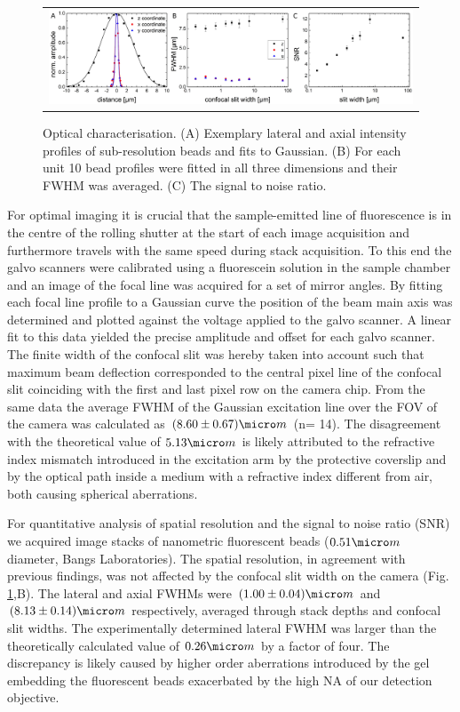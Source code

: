 \documentclass[12pt]{spieman}  %
\begin{document}
\begin{figure}
   \begin{center}
   \begin{tabular}{c}
   \includegraphics[width=\textwidth]{origin.eps}
   \end{tabular}
   \end{center}
   \caption{\label{fig:origin} Optical characterisation. (A) Exemplary lateral and axial intensity profiles of sub-resolution beads and fits to Gaussian. (B) For each unit 10 bead profiles were fitted in all three dimensions and their FWHM was averaged. (C) The signal to noise ratio.} 
\end{figure}

For optimal imaging it is crucial that the sample-emitted line of fluorescence is in the centre of the rolling shutter at the start of each image acquisition and furthermore travels with the same speed during stack acquisition. To this end the galvo scanners were calibrated using a fluorescein solution in the sample chamber and an image of the focal line was acquired for a set of mirror angles. By fitting each focal line profile to a Gaussian curve the position of the beam main axis was determined and plotted against the voltage applied to the galvo scanner. A linear fit to this data yielded the precise amplitude and offset for each galvo scanner. The finite width of the confocal slit was hereby taken into account such that maximum beam deflection corresponded to the central pixel line of the confocal slit coinciding with the first and last pixel row on the camera chip. From the same data the average FWHM of the Gaussian excitation line over the FOV of the camera was calculated as $(8.60\pm0.67)\micro m$ (n= 14). The disagreement with the theoretical value of $5.13 \micro m$ is likely attributed to the refractive index mismatch introduced in the excitation arm by the protective coverslip and by the optical path inside a medium with a refractive index different from air, both causing spherical aberrations\cite{Booth2001}.

For quantitative analysis of spatial resolution and the signal to noise ratio (SNR) we acquired image stacks of nanometric fluorescent beads ($0.51 \micro m$ diameter, Bangs Laboratories). The spatial resolution, in agreement with previous findings\cite{Wilson1987,Cox2004}, was not affected by the confocal slit width on the camera (Fig. \ref{fig:origin},B). The lateral and axial FWHMs were $(1.00\pm0.04) \micro m$ and $(8.13\pm0.14) \micro m$ respectively, averaged through stack depths and confocal slit widths. The experimentally determined lateral FWHM was larger than the theoretically calculated value of $0.26 \micro m$ by a factor of four. The discrepancy is likely caused by higher order aberrations introduced by the gel embedding the fluorescent beads exacerbated by the high NA of our detection objective\cite{Schwertner2004,Schwertner2007}.
\end{document}
